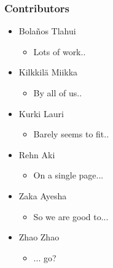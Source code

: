 \documentclass{beamer}
\begin{document}
\begin{frame}
    \frametitle{Contributors}
    \begin{itemize}
        \item Bolaños Tlahui
            \begin{itemize}
                \item Lots of work..
            \end{itemize}
        \item Kilkkilä Miikka
            \begin{itemize}
                \item By all of us..
            \end{itemize}
        \item Kurki Lauri
            \begin{itemize}
                \item Barely seems to fit..
            \end{itemize}
        \item Rehn Aki
            \begin{itemize}
                \item On a single page...
            \end{itemize}
        \item Zaka Ayesha
            \begin{itemize}
                \item So we are good to...
            \end{itemize}
        \item Zhao Zhao
            \begin{itemize}
                \item ... go?
            \end{itemize}
    \end{itemize}
    \center
\end{frame}
\end{document}
